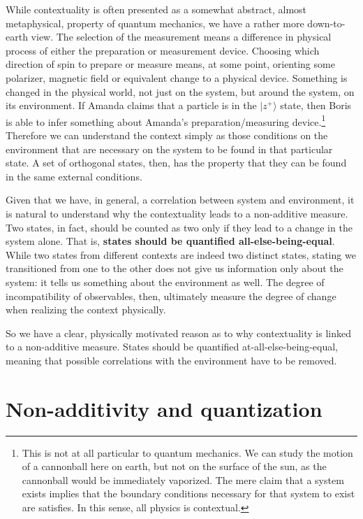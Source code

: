 \documentclass[10pt,twocolumn, nofootinbib]{revtex4-2}
\def\>{\rangle}
\begin{document}
While contextuality is often presented as a somewhat abstract, almost metaphysical, property of quantum mechanics, we have a rather more down-to-earth view. The selection of the measurement means a difference in physical process of either the preparation or measurement device. Choosing which direction of spin to prepare or measure means, at some point, orienting some polarizer, magnetic field or equivalent change to a physical device. Something is changed in the physical world, not just on the system, but around the system, on its environment. If Amanda claims that a particle is in the $|z^+\>$ state, then Boris is able to infer something about Amanda's preparation/measuring device.\footnote{This is not at all particular to quantum mechanics. We can study the motion of a cannonball here on earth, but not on the surface of the sun, as the cannonball would be immediately vaporized. The mere claim that a system exists implies that the boundary conditions necessary for that system to exist are satisfies. In this sense, all physics is contextual.} Therefore we can understand the context simply as those conditions on the environment that are necessary on the system to be found in that particular state. A set of orthogonal states, then, has the property that they can be found in the same external conditions.

Given that we have, in general, a correlation between system and environment, it is natural to understand why the contextuality leads to a non-additive measure. Two states, in fact, should be counted as two only if they lead to a change in the system alone. That is, \textbf{states should be quantified all-else-being-equal}. While two states from different contexts are indeed two distinct states, stating we transitioned from one to the other does not give us information only about the system: it tells us something about the environment as well. The degree of incompatibility of observables, then, ultimately measure the degree of change when realizing the context physically.

So we have a clear, physically motivated reason as to why contextuality is linked to a non-additive measure. States should be quantified at-all-else-being-equal, meaning that possible correlations with the environment have to be removed.

\section{Non-additivity and quantization}
\end{document}
